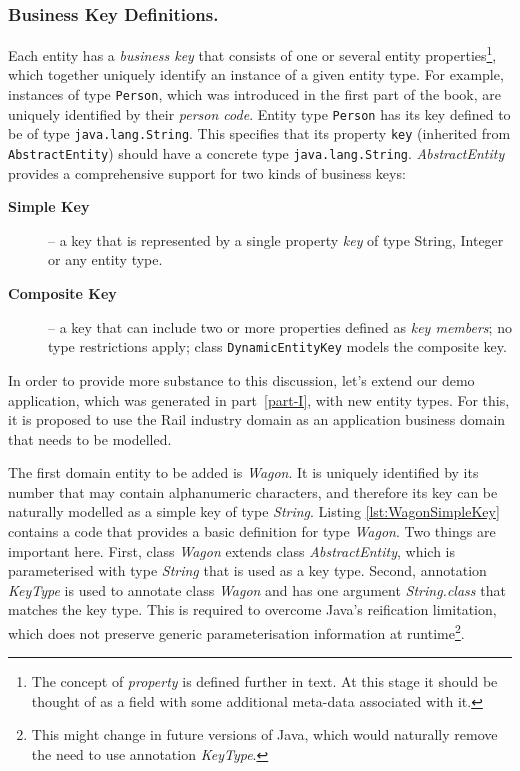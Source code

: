   \subsubsection*{Business Key Definitions.}
  Each entity has a \emph{business key} that consists of one or several entity properties\footnote{The concept of \emph{property} is defined further in text. At this stage it should be thought of as a field with some additional meta-data associated with it.}, which together uniquely identify an instance of a given entity type.
  For example, instances of type \texttt{Person}, which was introduced in the first part of the book, are uniquely identified by their \emph{person code}.
  Entity type \texttt{Person} has its key defined to be of type \texttt{java.lang.String}.
  This specifies that its property \texttt{key} (inherited from \texttt{AbstractEntity}) should have a concrete type \texttt{java.lang.String}.
  \emph{AbstractEntity} provides a comprehensive support for two kinds of business keys:
  \begin{description}
    \item[\textbf{Simple Key}] -- a key that is represented by a single property \emph{key} of type String, Integer or any entity type.
    \item[\textbf{Composite Key}] -- a key that can include two or more properties defined as \emph{key members}; no type restrictions apply; class \texttt{DynamicEntityKey} models the composite key.
   \end{description}

  In order to provide more substance to this discussion, let's extend our demo application, which was generated in part~\ref{part-I}, with new entity types.
  For this, it is proposed to use the Rail industry domain as an application business domain that needs to be modelled.
  
  The first domain entity to be added is \emph{Wagon}.
  It is uniquely identified by its number that may contain alphanumeric characters, and therefore its key can be naturally modelled as a simple key of type \emph{String}.
  Listing \ref{lst:WagonSimpleKey} contains a code that provides a basic definition for type \emph{Wagon}.
  Two things are important here.
  First, class \emph{Wagon} extends class \emph{AbstractEntity}, which is parameterised with type \emph{String} that is used as a key type.
  Second, annotation \emph{KeyType} is used to annotate class \emph{Wagon} and has one argument \emph{String.class} that matches the key type.
  This is required to overcome Java's reification limitation, which does not preserve generic parameterisation information at runtime\footnote{This might change in future versions of Java, which would naturally remove the need to use annotation \emph{KeyType}.}.

